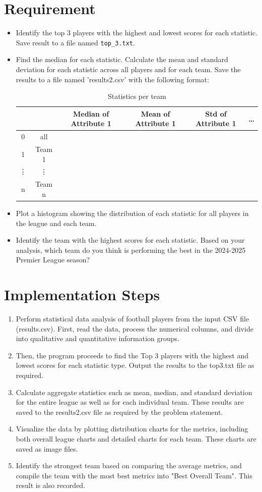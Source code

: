 \documentclass[12pt]{report}
\begin{document}
{{\section{Requirement} %
\begin{itemize}
	\item Identify the top 3 players with the highest and lowest scores for each statistic. Save result to a file named \texttt{top\_3.txt}.
	\item Find the median for each statistic.
Calculate the mean and standard deviation for each statistic across all players and for each team. Save the results to a file named 'results2.csv' with the following format:
	\begin{table}[h]
		\centering
		\begin{tabular}{|c|c|c|c|c|c|}
		\hline
		 &  & Median of Attribute 1 & Mean of Attribute 1 & Std of Attribute 1 & \ldots \\ \hline
		0 & all &  &  &  &  \\ \hline
		1 & Team 1 &  &  &  &  \\ \hline
		\vdots & \vdots &  &  &  &  \\ \hline
		n & Team n &  &  &  &  \\ \hline
		\end{tabular}
		\caption{Statistics per team} %
	\end{table}
	\item Plot a histogram showing the distribution of each statistic for all players in the league and each team.
	\item Identify the team with the highest scores for each statistic. Based on your analysis, which team do you think is performing the best in the 2024-2025 Premier League season?
\end{itemize}
\section{Implementation Steps} %
\begin{enumerate}
	\item Perform statistical data analysis of football players from the input CSV file (results.csv). First, read the data, process the numerical columns, and divide into qualitative and quantitative information groups.
\item Then, the program proceeds to find the Top 3 players with the highest and lowest scores for each statistic type. Output the results to the top3.txt file as required.
	\item Calculate aggregate statistics such as mean, median, and standard deviation for the entire league as well as for each individual team. These results are saved to the results2.csv file as required by the problem statement.
\item Visualize the data by plotting distribution charts for the metrics, including both overall league charts and detailed charts for each team. These charts are saved as image files.
\item Identify the strongest team based on comparing the average metrics, and compile the team with the most best metrics into "Best Overall Team". This result is also recorded.
\end{enumerate}
}}
\end{document}
